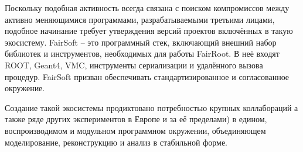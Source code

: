 Поскольку подобная активность всегда связана с поиском компромиссов
между активно меняющимися программами, разрабатываемыми третьими
лицами, подобное начинание требует утверждения версий
проектов включённых в такую экосистему. FairSoft -- это программный
стек, включающий внешний набор библиотек и
инструментов, необходимых для работы FairRoot. В неё входят
ROOT, Geant4, VMC, инструменты сериализации и удалённого вызова
процедур. FairSoft призван обеспечивать стандартизированное
и согласованное окружение.

Создание такой экосистемы продиктовано потребностью
крупных коллабораций %
а также ряде других экспериментов в Европе и за её пределами)
в едином, воспроизводимом и модульном программном окружении,
объединяющем моделирование, реконструкцию и анализ в стабильной
форме.
